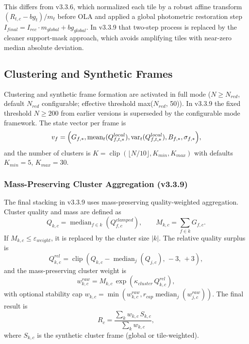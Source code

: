 \documentclass[10pt,twocolumn]{article}
\begin{document}
This differs from v3.3.6, which normalized each tile by a robust affine transform
$(R_{t,c}-bg_t)/m_t$ before OLA and applied a global photometric restoration step
$I_{final}=I_{rec}\cdot m_{global}+bg_{global}$. In v3.3.9 that two-step process is replaced
by the cleaner support-mask approach, which avoids amplifying tiles with near-zero median
absolute deviation.

\subsection{Clustering and Synthetic Frames}

Clustering and synthetic frame formation are activated in full mode
($N\ge N_{red}$, default $N_{red}$ configurable; effective threshold max($N_{red}$, 50)).
In v3.3.9 the fixed threshold $N\ge200$ from earlier versions is superseded by the configurable
mode framework. The state vector per frame is
\begin{equation}
  v_f =
  \Bigl(
  G_{f,*},
  \operatorname{mean}_t(Q_{f,t,*}^{local}),
  \operatorname{var}_t(Q_{f,t,*}^{local}),
  B_{f,*},
  \sigma_{f,*}
  \Bigr),
\end{equation}
and the number of clusters is $K=\operatorname{clip}(\lfloor N/10\rfloor,K_{min},K_{max})$
with defaults $K_{min}=5$, $K_{max}=30$.

\subsubsection{Mass-Preserving Cluster Aggregation (v3.3.9)}

The final stacking in v3.3.9 uses mass-preserving quality-weighted aggregation.
Cluster quality and mass are defined as
\begin{equation}
  Q_{k,c} = \operatorname{median}_{f\in k}(Q_{f,c}^{clamped}),
  \qquad
  M_{k,c} = \sum_{f\in k} G_{f,c}.
\end{equation}
If $M_{k,c}\le\varepsilon_{weight}$, it is replaced by the cluster size $|k|$.
The relative quality surplus is
\begin{equation}
  Q_{k,c}^{rel} = \operatorname{clip}(Q_{k,c}-\operatorname{median}_j(Q_{j,c}),\,-3,\,+3),
\end{equation}
and the mass-preserving cluster weight is
\begin{equation}
  w_{k,c}^{raw} = M_{k,c}\,\exp(\kappa_{cluster}\,Q_{k,c}^{rel}),
\end{equation}
with optional stability cap $w_{k,c}=\min(w_{k,c}^{raw},r_{cap}\operatorname{median}_j(w_{j,c}^{raw}))$.
The final result is
\begin{equation}
  R_c = \frac{\sum_k w_{k,c}\,S_{k,c}}{\sum_k w_{k,c}},
\end{equation}
where $S_{k,c}$ is the synthetic cluster frame (global or tile-weighted).
\end{document}
